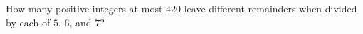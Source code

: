 How many positive integers at most $420$ leave different remainders when divided by each of $5$,  $6$,  and $7$?
